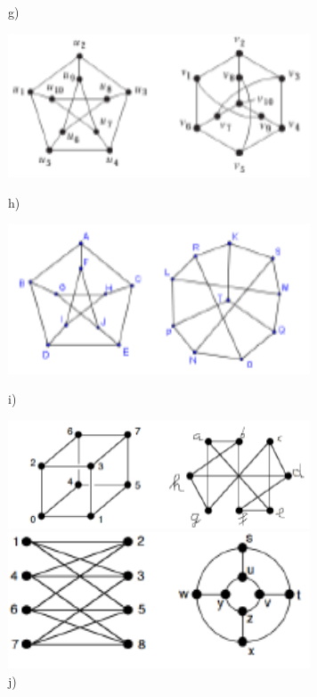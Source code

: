 \documentclass[12pt,en,a4paper]{article}
\begin{document}
\begin{figure}[ht]
\begin{minipage}{0.5\textwidth}
			\caption*{g)}
			\label{fig:gprob4_7}
		\end{minipage}
		\begin{minipage}{0.5\textwidth}
			\includegraphics[width=0.8\textwidth]{gprob4_8.png}
			\caption*{h)}
			\label{fig:gprob4_8}
		\end{minipage}
		\begin{minipage}{0.5\textwidth}
			\includegraphics[width=0.8\textwidth]{gprob4_9.png}
			\caption*{i)}
			\label{fig:gprob4_9}
		\end{minipage}
		\begin{minipage}{0.5\textwidth}
			\includegraphics[width=0.8\textwidth]{gprob4_10.png}
			\caption*{j)}
			\label{fig:gprob4_10}
		\end{minipage}
		\begin{minipage}{0.5\textwidth}
			\includegraphics[width=0.8\textwidth]{gprob4_11.png}

\end{minipage}
\end{figure}
\end{document}
